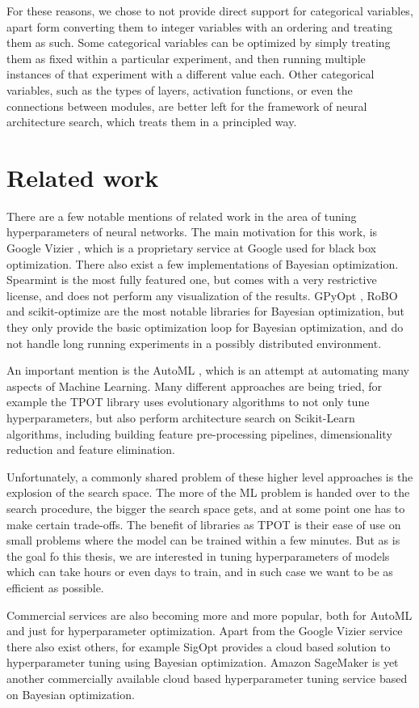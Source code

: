 For these reasons, we chose to not provide direct support for categorical
variables, apart form converting them to integer variables with an ordering and
treating them as such. Some categorical variables can be optimized by simply
treating them as fixed within a particular experiment, and then running
multiple instances of that experiment with a different value each. Other
categorical variables, such as the types of layers, activation functions, or
even the connections between modules, are better left for the framework of
neural architecture search, which treats them in a principled way.


\section{Related work}

There are a few notable mentions of related work in the area of tuning
hyperparameters of neural networks. The main motivation for this work, is
Google Vizier \citep{google-vizier}, which is a proprietary service at Google
used for black box optimization. There also exist a few implementations of
Bayesian optimization. Spearmint \citep{spearmint} is the most fully featured
one, but comes with a very restrictive license, and does not perform any
visualization of the results. GPyOpt \citep{gpyopt2016}, RoBO \citep{robo} and scikit-optimize
\citep{scikit-optimize} are the most notable libraries for Bayesian
optimization, but they only provide the basic optimization loop for Bayesian
optimization, and do not handle long running experiments in a possibly
distributed environment.

An important mention is the AutoML \citep{automl}, which is an attempt at automating many aspects of Machine Learning. Many different approaches are being tried, for example the TPOT \citep{tpot} library uses evolutionary algorithms to not only tune hyperparameters, but also perform architecture search on Scikit-Learn algorithms, including building feature pre-processing pipelines, dimensionality reduction and feature elimination.

Unfortunately, a commonly shared problem of these higher level approaches is the explosion of the search space. The more of the ML problem is handed over to the search procedure, the bigger the search space gets, and at some point one has to make certain trade-offs. The benefit of libraries as TPOT is their ease of use on small problems where the model can be trained within a few minutes. But as is the goal fo this thesis, we are interested in tuning hyperparameters of models which can take hours or even days to train, and in such case we want to be as efficient as possible.

Commercial services are also becoming more and more popular, both for AutoML and just for hyperparameter optimization. Apart from the Google Vizier service \citep{google-vizier} there also exist others, for example SigOpt \citep{sigopt} provides a cloud based solution to hyperparameter tuning using Bayesian optimization. Amazon SageMaker \citep{amazon-sagemaker} is yet another commercially available cloud based hyperparameter tuning service based on Bayesian optimization.



